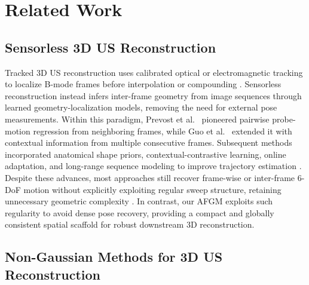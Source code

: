 \vspace{-6mm}
\section{Related Work}
\label{sec:related-work}

\subsection{Sensorless 3D US Reconstruction}
\label{sec:related-work:sensorless-3d-us-reconstruction}

Tracked 3D US reconstruction uses calibrated optical or electromagnetic
tracking to localize B-mode frames before interpolation or compounding
\cite{huang2017}.
Sensorless reconstruction instead infers inter-frame geometry from image
sequences through learned geometry-localization models, removing the need for
external pose measurements.
Within this paradigm, Prevost et al.~\cite{prevostDeepLearningSensorless2017}
pioneered pairwise probe-motion regression from neighboring frames, while
Guo et al.~\cite{guoSensorlessFreehand3D2020} extended it with contextual
information from multiple consecutive frames.
Subsequent methods incorporated anatomical shape priors,
contextual-contrastive learning, online adaptation, and long-range sequence
modeling to improve trajectory estimation
\cite{luoSelfContextShape2021,guoUltrasoundVolumeReconstruction2023,
luoRecONOnlineLearning2023,li2024f}.
Despite these advances, most approaches still recover frame-wise or inter-frame
6-DoF motion without explicitly exploiting regular sweep structure, retaining
unnecessary geometric complexity
\cite{huangMMSEReconstruction2008,liTUSREC2024}.
In contrast, our AFGM exploits such regularity to avoid dense pose recovery,
providing a compact and globally consistent spatial scaffold for robust
downstream 3D reconstruction.

\vspace{-3mm}
\subsection{Non-Gaussian Methods for 3D US Reconstruction}
\label{sec:related-work:non-gaussian-methods-for-3d-us-reconstruction}

